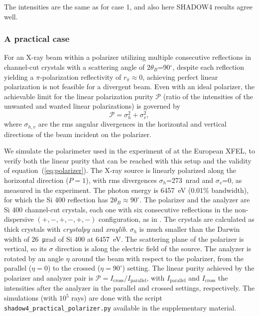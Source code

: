 \documentclass{iucr}
\begin{document}
The intensities are the same as for case 1, and also here SHADOW4 results agree well. 

\subsubsection{A practical case}\label{sec:polarizers45degPractical}

For an X-ray beam within a polarizer utilizing multiple consecutive reflections in channel-cut crystals with a scattering angle of $2\theta_B$=90$^\circ$, despite each reflection yielding a $\pi$-polarization reflectivity of $r_\pi\approx 0$, achieving perfect linear polarization is not feasible for a divergent beam.
Even with an ideal polarizer, the achievable limit for the linear polarization purity $\mathcal{P}$ (ratio of the intensities of the unwanted and wanted linear polarizations) is governed by \cite{Schulze2018}
\begin{equation}\label{eq:polarizer}
    \mathcal{P} = \sigma_h^2 + \sigma_v^2,
\end{equation}
where $\sigma_{h,v}$ are the rms angular divergences in the horizontal and vertical directions of the beam incident on the polarizer.

We simulate the polarimeter used in the experiment of \cite{Schulze2022} at the European XFEL, to verify both the linear purity that can be reached with this setup and the validity of equation~(\ref{eq:polarizer}).
The X-ray source is linearly polarized along the horizontal direction ($P=1$), with rms divergences $\sigma_h$=\SI{273}{\nano\radian} and $\sigma_v$=0, as measured in the experiment.
The photon energy is \SI{6457}{eV} (0.01\% bandwidth), for which the Si 400 reflection has $2\theta_B\approx 90^\circ$.
The polarizer and the analyzer are Si 400 channel-cut crystals, each one with six consecutive reflections in the non-dispersive $(+,-,+,-,+,-)$ configuration, as in \cite{Schulze2022}.
The crystals are calculated as thick crystals with {\it crystalpy} and {\it xraylib}.
$\sigma_h$ is much smaller than the Darwin width of \SI{26}{\micro\radian} of Si 400 at \SI{6457}{eV}.
The scattering plane of the polarizer is vertical, so its $\sigma$ direction is along the electric field of the source. The analyzer is rotated by an angle $\eta$ around the beam with respect to the polarizer, from the parallel ($\eta=0$) to the crossed ($\eta=90^\circ$) setting.
The linear purity achieved by the polarizer and analyzer pair is $\mathcal{P}=I_\text{cross}/I_\text{parallel}$, with $I_\text{parallel}$ and $I_\text{cross}$ the intensities after the analyzer in the parallel and crossed settings, respectively.
The simulations (with $10^5$ rays) are done with the script {\tt shadow4\_practical\_polarizer.py} available in the supplementary material.
\end{document}
